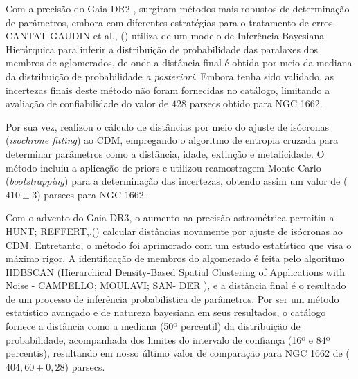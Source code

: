 \documentclass[12pt]{projeto}
\begin{document}
Com a precisão do Gaia DR2 \cite{gaia_collaboration_gaia_2018}, surgiram métodos mais robustos de determinação de parâmetros, embora com diferentes estratégias para o tratamento de erros. CANTAT-GAUDIN et al., (\citeyear{cantat-gaudin_painting_2020}) utiliza de um modelo de Inferência Bayesiana Hierárquica para inferir a distribuição de probabilidade das paralaxes dos membros de aglomerados, de onde a distância final é obtida por meio da mediana da distribuição de probabilidade \textit{a posteriori}. Embora tenha sido validado, as incertezas finais deste método não foram fornecidas no catálogo, limitando a avaliação de confiabilidade do valor de \(428\) parsecs obtido para NGC 1662.

Por sua vez, \cite{dias_updated_2021} realizou o cálculo de distâncias por meio do ajuste de isócronas (\textit{isochrone fitting}) ao CDM, empregando o algoritmo de entropia cruzada para determinar parâmetros como a distância, idade, extinção e metalicidade. O método incluiu a aplicação de priors e utilizou reamostragem Monte-Carlo (\textit{bootstrapping}) para a determinação das incertezas, obtendo assim um valor de (\(410 \pm 3\)) parsecs para NGC 1662.

Com o advento do Gaia DR3, o aumento na precisão astrométrica permitiu a HUNT; REFFERT,.(\citeyear{hunt_improving_2024}) calcular distâncias novamente por ajuste de isócronas ao CDM. Entretanto, o método foi aprimorado com um estudo estatístico que visa o máximo rigor. A identificação de membros do algomerado é feita pelo algoritmo HDBSCAN (Hierarchical Density-Based Spatial Clustering of Applications with Noise - CAMPELLO; MOULAVI; SAN-
DER \citeyear{campello_density-based_2013}), e a distância final é o resultado de um processo de inferência probabilística de parâmetros. Por ser um método estatístico avançado e de natureza bayesiana em seus resultados, o catálogo fornece a distância como a mediana (50º percentil) da distribuição de probabilidade, acompanhada dos limites do intervalo de confiança (16º e 84º percentis), resultando em nosso último valor de comparação para NGC 1662 de (\(404,60 \pm  0,28\)) parsecs. 
\end{document}
